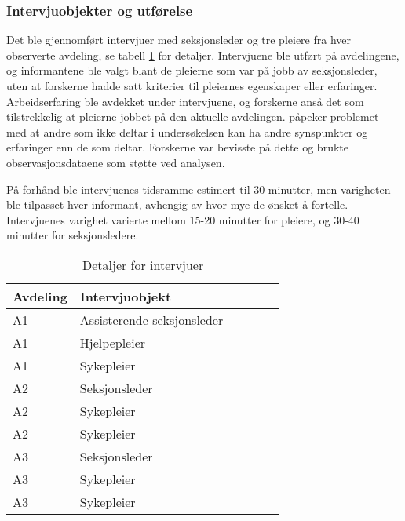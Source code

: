 \subsubsection{Intervjuobjekter og utførelse}
Det ble gjennomført intervjuer med seksjonsleder og tre pleiere fra hver observerte avdeling, se tabell \ref{detaljerintervju} for detaljer. Intervjuene ble utført på avdelingene, og informantene ble valgt blant de pleierne som var på jobb av seksjonsleder, uten at forskerne hadde satt kriterier til pleiernes egenskaper eller erfaringer. Arbeidserfaring ble avdekket under intervjuene, og forskerne anså det som tilstrekkelig at pleierne jobbet på den aktuelle avdelingen. \citet{Tjora} påpeker problemet med at andre som ikke deltar i undersøkelsen kan ha andre synspunkter og erfaringer enn de som deltar. Forskerne var bevisste på dette og brukte observasjonsdataene som støtte ved analysen.
 
\noindent
På forhånd ble intervjuenes tidsramme estimert til 30 minutter, men varigheten ble tilpasset hver informant, avhengig av hvor mye de ønsket å fortelle. Intervjuenes varighet varierte mellom 15-20 minutter for pleiere, og 30-40 minutter for seksjonsledere.
 
\begin{table}[H]\centering
    \begin{tabular}{ |l|l|l|l|l|l| }
    \hline
    \textbf{Avdeling} & \textbf{Intervjuobjekt} \\ \hline
       A1 & Assisterende seksjonsleder \\ \hline
       A1 & Hjelpepleier \\ \hline
       A1 & Sykepleier \\ \hline
       A2 & Seksjonsleder \\ \hline
       A2 & Sykepleier \\ \hline
       A2 & Sykepleier \\ \hline
       A3 & Seksjonsleder \\ \hline
       A3 & Sykepleier \\ \hline
       A3 & Sykepleier \\ \hline
    \end{tabular}
    \caption {Detaljer for intervjuer}
    \label{detaljerintervju}
\end{table}
